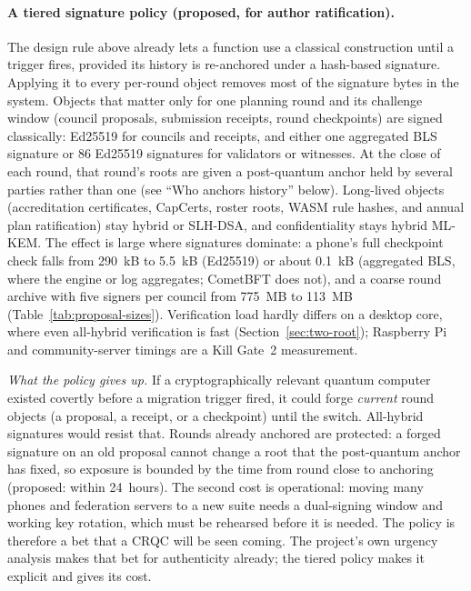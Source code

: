 \documentclass[10pt,twoside,openany]{book}
\theoremstyle{dpepstyle}
\begin{document}
\paragraph{A tiered signature policy (proposed, for author ratification).} The design rule above already lets a function use a classical construction until a trigger fires, provided its history is re-anchored under a hash-based signature. Applying it to every per-round object removes most of the signature bytes in the system. Objects that matter only for one planning round and its challenge window (council proposals, submission receipts, round checkpoints) are signed classically: Ed25519 for councils and receipts, and either one aggregated BLS signature or 86 Ed25519 signatures for validators or witnesses. At the close of each round, that round's roots are given a post-quantum anchor held by several parties rather than one (see ``Who anchors history'' below). Long-lived objects (accreditation certificates, CapCerts, roster roots, WASM rule hashes, and annual plan ratification) stay hybrid or SLH-DSA, and confidentiality stays hybrid ML-KEM. The effect is large where signatures dominate: a phone's full checkpoint check falls from 290~kB to 5.5~kB (Ed25519) or about 0.1~kB (aggregated BLS, where the engine or log aggregates; CometBFT does not), and a coarse round archive with five signers per council from 775~MB to 113~MB (Table~\ref{tab:proposal-sizes}). Verification load hardly differs on a desktop core, where even all-hybrid verification is fast (Section~\ref{sec:two-root}); Raspberry Pi and community-server timings are a Kill Gate~2 measurement.

\noindent\emph{What the policy gives up.} If a cryptographically relevant quantum computer existed covertly before a migration trigger fired, it could forge \emph{current} round objects (a proposal, a receipt, or a checkpoint) until the switch. All-hybrid signatures would resist that. Rounds already anchored are protected: a forged signature on an old proposal cannot change a root that the post-quantum anchor has fixed, so exposure is bounded by the time from round close to anchoring (proposed: within 24~hours). The second cost is operational: moving many phones and federation servers to a new suite needs a dual-signing window and working key rotation, which must be rehearsed before it is needed. The policy is therefore a bet that a CRQC will be seen coming. The project's own urgency analysis makes that bet for authenticity already; the tiered policy makes it explicit and gives its cost.
\end{document}
